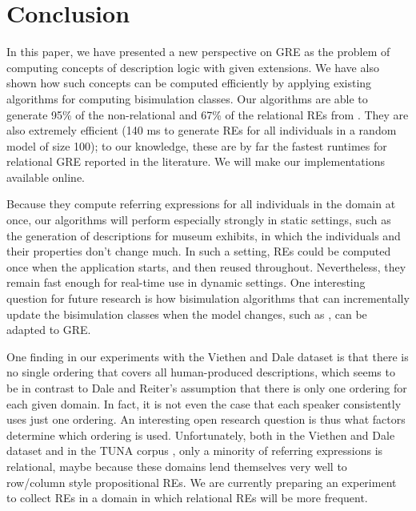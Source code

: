 \section{Conclusion} \label{sec:conclusion}

In this paper, we have presented a new perspective on GRE as the
problem of computing concepts of description logic with given
extensions.  We have also shown how such concepts can be computed
efficiently by applying existing algorithms for computing bisimulation
classes.  Our algorithms are able to generate 95\% of the
non-relational and 67\% of the relational REs from
.  They are also
extremely efficient (140 ms to generate REs for all individuals in a
random model of size 100); to our knowledge, these are by far the
fastest runtimes for relational GRE reported in the literature.  We
will make our implementations available online.

Because they compute referring expressions for all individuals in the
domain at once, our algorithms will perform especially strongly in
static settings, such as the generation of descriptions for museum
exhibits, in which the individuals and their properties don't change
much.  In such a setting, REs could be computed once when the
application starts, and then reused throughout.  Nevertheless, they
remain fast enough for real-time use in dynamic settings.  One
interesting question for future research is how bisimulation
algorithms that can incrementally update the bisimulation classes when
the model changes, such as , can be adapted to GRE.

One finding in our experiments with the Viethen and Dale dataset is
that there is no single ordering that covers all human-produced
descriptions, which seems to be in contrast to Dale and Reiter's
 assumption that there is only one ordering for
each given domain.  In fact, it is not even the case that each speaker
consistently uses just one ordering.  An interesting open research
question is thus what factors determine which ordering is used.
Unfortunately, both in the Viethen and Dale dataset and in the TUNA
corpus \cite{deemter06:_build_seman_trans_corpus_for}, only a minority
of referring expressions is relational, maybe because these domains
lend themselves very well to row/column style propositional REs.  We
are currently preparing an experiment to collect REs in a domain in
which relational REs will be more frequent.



